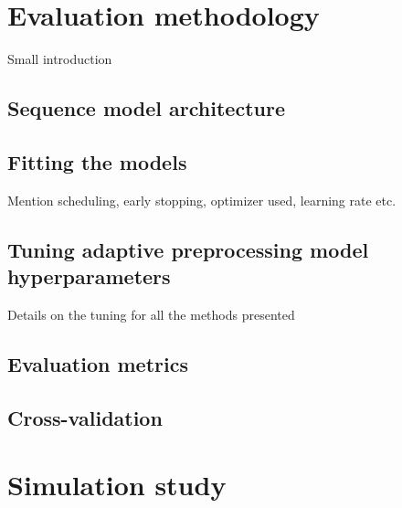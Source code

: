 \documentclass{statsmsc}
\begin{document}
\section{Evaluation methodology}%
\label{sec:Evaluation methodology}%

Small introduction

\subsection{Sequence model architecture}%
\label{sub:Sequence model architecture}


\subsection{Fitting the models}%
\label{sub:Fitting the models}

Mention scheduling, early stopping, optimizer used, learning rate etc.

\subsection{Tuning adaptive preprocessing model hyperparameters}%
\label{sub:Tuning adaptive preprocessing model hyperparameters}

Details on the tuning for all the methods presented

\subsection{Evaluation metrics}%
\label{sub:Evaluation metrics}


\subsection{Cross-validation}%
\label{sub:Cross-validation}



\section{Simulation study}%
\label{sec:Simulation study}%
\end{document}
